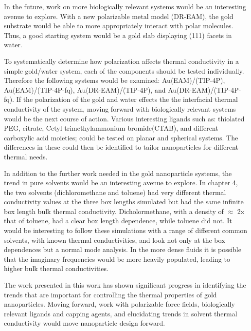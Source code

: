 In the future, work on more biologically relevant systems would be an interesting avenue to explore. 
With a new polarizable metal model (DR-EAM), the gold substrate would be able to more appropriately interact with polar molecules.
Thus, a good starting system would be a gold slab displaying (111) facets in water.

To systematically determine how polarization affects thermal conductivity in a simple gold/water system, each of the components should be tested individually. Therefore the following systems would be examined: Au(EAM)/(TIP-4P),  Au(EAM)/(TIP-4P-fq),  Au(DR-EAM)/(TIP-4P),  and Au(DR-EAM)/(TIP-4P-fq).
If the polarization of the gold and water effects the the interfacial thermal conductivity of the system, moving forward with biologically relevant systems would be the next course of action.
Various interesting ligands such as: thiolated PEG, citrate, Cetyl trimethylammonium bromide(CTAB), and different carboxylic acid moieties; could be tested on planar and spherical systems. The differences in these could then be identified to tailor nanoparticles for different thermal needs.

In addition to the further work needed in the gold nanoparticle systems, the trend in pure solvents would be an interesting avenue to explore.
In chapter 4, the two solvents (dichloromethane and toluene) had very different thermal conductivity values at the three box lengths simulated but had the same infinite box length bulk thermal conductivity.
Dicholormethane, with a density of $\approx$ 2x that of toluene, had a clear box length dependence, while toluene did not. 
It would be interesting to follow these simulations with a range of different common solvents, with known thermal conductivities, and look not only at the box dependences but a normal mode analysis.
In the more dense fluids it is possible that the imaginary frequencies would be more heavily populated, leading to higher bulk thermal conductivities.

The work presented in this work has shown significant progress in identifying the trends that are important for controlling the thermal properties of gold nanoparticles. Moving forward, work with polarizable force fields, biologically relevant ligands and capping agents, and elucidating trends in solvent thermal conductivity would move nanoparticle design forward.
